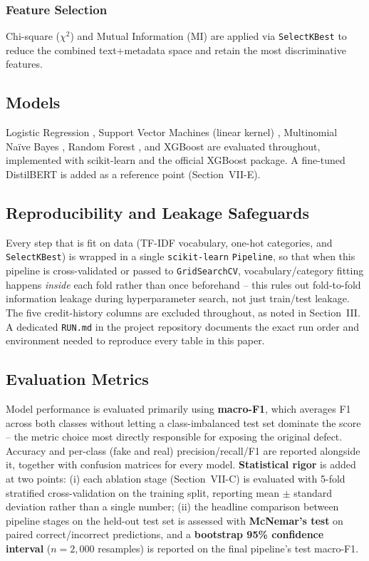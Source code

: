 \documentclass[conference]{IEEEtran}
\begin{document}
\subsubsection{Feature Selection} Chi-square ($\chi^2$) and Mutual Information (MI)
\cite{yang1997featureselection} are applied via \texttt{SelectKBest} to reduce the
combined text+metadata space and retain the most discriminative features.

\subsection{Models}
Logistic Regression \cite{bishop2006pattern}, Support Vector Machines (linear
kernel) \cite{cortes1995svm}, Multinomial Na\"ive Bayes \cite{mccallum1998nb},
Random Forest \cite{breiman2001rf}, and XGBoost \cite{chen2016xgboost} are
evaluated throughout, implemented with scikit-learn \cite{pedregosa2011sklearn} and
the official XGBoost package. A fine-tuned DistilBERT \cite{sanh2019distilbert} is
added as a reference point (Section~VII-E).

\subsection{Reproducibility and Leakage Safeguards}
Every step that is fit on data (TF-IDF vocabulary, one-hot categories, and
\texttt{SelectKBest}) is wrapped in a single \texttt{scikit-learn}
\texttt{Pipeline}, so that when this pipeline is cross-validated or passed to
\texttt{GridSearchCV}, vocabulary/category fitting happens \emph{inside} each fold
rather than once beforehand -- this rules out fold-to-fold information leakage
during hyperparameter search, not just train/test leakage. The five credit-history
columns are excluded throughout, as noted in Section~III. A dedicated
\texttt{RUN.md} in the project repository documents the exact run order and
environment needed to reproduce every table in this paper.

\subsection{Evaluation Metrics}
Model performance is evaluated primarily using \textbf{macro-F1}, which averages
F1 across both classes without letting a class-imbalanced test set dominate the
score -- the metric choice most directly responsible for exposing the original
defect. Accuracy and per-class (fake and real) precision/recall/F1 are reported
alongside it, together with confusion matrices for every model.
\textbf{Statistical rigor} is added at two points: (i) each ablation stage
(Section~VII-C) is evaluated with 5-fold stratified cross-validation on the
training split, reporting mean $\pm$ standard deviation rather than a single
number; (ii) the headline comparison between pipeline stages on the held-out test
set is assessed with \textbf{McNemar's test} \cite{mcnemar1947} on paired
correct/incorrect predictions, and a \textbf{bootstrap 95\% confidence interval}
\cite{efron1979bootstrap} ($n=2{,}000$ resamples) is reported on the final
pipeline's test macro-F1.
\end{document}

